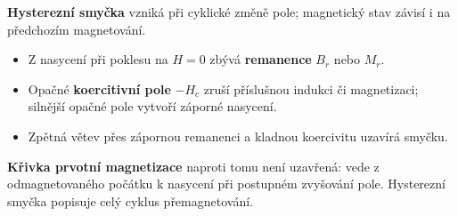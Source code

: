 \textbf{Hysterezní smyčka} vzniká při cyklické změně pole; magnetický stav závisí i na předchozím magnetování.
\begin{itemize}
\item Z nasycení při poklesu na $H=0$ zbývá \textbf{remanence} $B_r$ nebo $M_r$.
\item Opačné \textbf{koercitivní pole} $-H_c$ zruší příslušnou indukci či magnetizaci; silnější opačné pole vytvoří záporné nasycení.
\item Zpětná větev přes zápornou remanenci a kladnou koercivitu uzavírá smyčku.
\end{itemize}
\textbf{Křivka prvotní magnetizace} naproti tomu není uzavřená: vede z odmagnetovaného počátku k nasycení při postupném zvyšování pole. Hysterezní smyčka popisuje celý cyklus přemagnetování.
